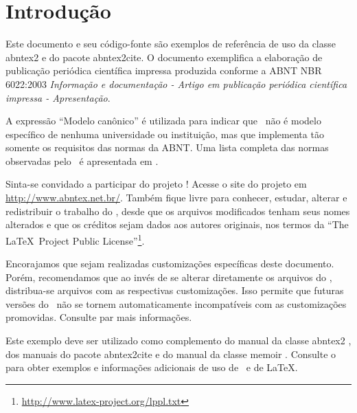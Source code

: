 
\section*{Introdução}

Este documento e seu código-fonte são exemplos de referência de uso da classe
\textsf{abntex2} e do pacote \textsf{abntex2cite}. O documento exemplifica a
elaboração de publicação periódica científica impressa produzida conforme a ABNT
NBR 6022:2003 \emph{Informação e documentação - Artigo em publicação periódica
científica impressa - Apresentação}.

A expressão ``Modelo canônico'' é utilizada para indicar que \abnTeX\ não é
modelo específico de nenhuma universidade ou instituição, mas que implementa tão
somente os requisitos das normas da ABNT. Uma lista completa das normas
observadas pelo \abnTeX\ é apresentada em .

Sinta-se convidado a participar do projeto \abnTeX! Acesse o site do projeto em
\url{http://www.abntex.net.br/}. Também fique livre para conhecer,
estudar, alterar e redistribuir o trabalho do \abnTeX, desde que os arquivos
modificados tenham seus nomes alterados e que os créditos sejam dados aos
autores originais, nos termos da ``The \LaTeX\ Project Public
License''\footnote{\url{http://www.latex-project.org/lppl.txt}}.

Encorajamos que sejam realizadas customizações específicas deste documento.
Porém, recomendamos que ao invés de se alterar diretamente os arquivos do
\abnTeX, distribua-se arquivos com as respectivas customizações. Isso permite
que futuras versões do \abnTeX~não se tornem automaticamente incompatíveis com
as customizações promovidas. Consulte 
par mais informações.

Este exemplo deve ser utilizado como complemento do manual da classe
\textsf{abntex2} \cite{abntex2classe}, dos manuais do pacote
\textsf{abntex2cite} \cite{abntex2cite,abntex2cite-alf} e do manual da classe
\textsf{memoir} \cite{memoir}. Consulte o  para obter
exemplos e informações adicionais de uso de \abnTeX\ e de \LaTeX.



\newpage
